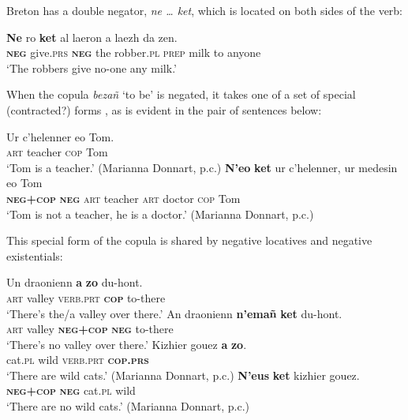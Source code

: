\documentclass[output=paper,colorlinks,citecolor=brown]{langscibook}
\begin{document}
\begin{paperappendix}
\begin{unindented}

Breton has a double negator, \textit{ne … ket}, which is located on both sides of the verb:
%
\begin{exe}\ex \gll \textbf{Ne} ro \textbf{ket}   al  laeron a laezh da zen. \\
\textbf{\textsc{neg}} give.\textsc{prs} \textbf{\textsc{neg}} the robber.\textsc{pl} \textsc{prep} milk   to anyone \\
    \glt `The robbers give no-one any milk.' \citep[126]{Press1986}
    \end{exe}

When the copula \textit{bezañ} `to be' \citep[144]{Press1986} is negated, it takes one of a set of special (contracted?) forms \citep[152]{Press1986}, as is evident in the pair of sentences below:
%
\begin{exe}\ex \gll Ur   c’helenner eo    Tom. \\
\textsc{art} teacher \textsc{cop} Tom \\
    \glt `Tom is a teacher.' (Marianna Donnart, p.c.)
\ex \gll \textbf{N’eo} \textbf{ket} ur c’helenner, ur medesin eo Tom \\
\textbf{\textsc{neg+cop}} \textbf{\textsc{neg}} \textsc{art} teacher        \textsc{art} doctor    \textsc{cop} Tom \\
    \glt `Tom is not a teacher, he is a doctor.' (Marianna Donnart, p.c.)
    \end{exe}

This special form of the copula is shared by negative locatives and negative existentials:
%
\begin{exe}\ex \gll Un  draonienn \textbf{a} \textbf{zo}   du-hont. \\
\textsc{art} valley \textsc{verb.prt} \textbf{\textsc{cop}} to-there \\
    \glt `There's the/a valley over there.' \citep[154]{Press1986}
\ex \gll
An   draonienn \textbf{n’emañ}     \textbf{ket}  du-hont. \\
\textsc{art} valley \textbf{\textsc{neg+cop}} \textbf{\textsc{neg}} to-there \\
    \glt `There's no valley over there.' \citep[155]{Press1986}
\ex \gll Kizhier gouez \textbf{a} \textbf{zo}. \\
cat.\textsc{pl}   wild   \textsc{verb.prt} \textbf{\textsc{cop.prs}} \\
    \glt `There are wild cats.' (Marianna Donnart, p.c.)
\ex \gll \textbf{N’eus} \textbf{ket}   kizhier gouez. \\
\textbf{\textsc{neg+cop}} \textbf{\textsc{neg}} cat.\textsc{pl} wild \\
    \glt `There are no wild cats.' (Marianna Donnart, p.c.)
    \end{exe}


\end{unindented}
\end{paperappendix}
\end{document}

